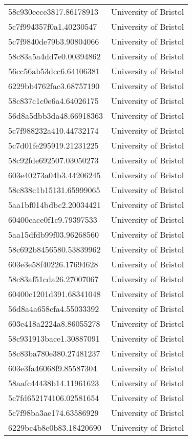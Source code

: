 \begin{tabular}{ll}
58c930eece3817.86178913 & University of Bristol \\
5c7f994357f0a1.40230547 & University of Bristol \\
5c7f9840de79b3.90804066 & University of Bristol \\
58c83a5a4dd7e0.00394862 & University of Bristol \\
56cc56ab53dcc6.64106381 & University of Bristol \\
6229bb4762fac3.68757190 & University of Bristol \\
58c837c1c0e6a4.64026175 & University of Bristol \\
56d8a5dbb3da48.66918363 & University of Bristol \\
5c7f988232a410.44732174 & University of Bristol \\
5c7d01fe295919.21231225 & University of Bristol \\
58c92fde692507.03050273 & University of Bristol \\
603e40273a04b3.44206245 & University of Bristol \\
58c838c1b15131.65999065 & University of Bristol \\
5aa1bf014bdbc2.20034421 & University of Bristol \\
60400cace0f1c9.79397533 & University of Bristol \\
5aa15dfdb99f03.96268560 & University of Bristol \\
58c692b8456580.53839962 & University of Bristol \\
603e3e58f40226.17694628 & University of Bristol \\
58c83af51cda26.27007067 & University of Bristol \\
60400c1201d391.68341048 & University of Bristol \\
56d8a4a658cfa4.55033392 & University of Bristol \\
603e418a2224a8.86055278 & University of Bristol \\
58c931913bace1.30887091 & University of Bristol \\
58c83ba780e380.27481237 & University of Bristol \\
603e3fa46068f9.85587304 & University of Bristol \\
58aafc44438b14.11961623 & University of Bristol \\
5c7fd652174106.02581654 & University of Bristol \\
5c7f98ba3ae174.63586929 & University of Bristol \\
6229bc4b8e0b83.18420690 & University of Bristol \\

\end{tabular}
